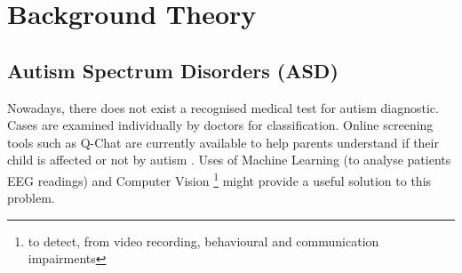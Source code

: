 \chapter{Background Theory}

  
\newenvironment{conditions}[1][where:]
  {#1 \begin{tabular}[t]{>{$}l<{$} @{${}={}$} l}}
  {\end{tabular}\\[\belowdisplayskip]}

\label{ch:background}

\section{Autism Spectrum Disorders (ASD)}

Nowadays, there does not exist a recognised medical test for autism diagnostic. Cases are examined individually by doctors for classification. Online screening tools such as Q-Chat are currently available to help parents understand if their child is affected or not by autism \cite{screening}. Uses of Machine Learning (to analyse patients EEG readings) and Computer Vision \footnote{to detect, from video recording, behavioural and communication impairments} might provide a useful solution to this problem. 

